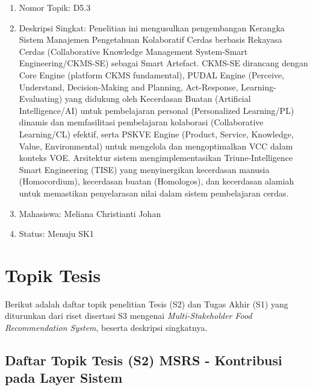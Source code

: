 \documentclass[
  letterpaper,
  DIV=11,
  numbers=noendperiod]{scrreprt}
\providecommand{\tightlist}{%
  \setlength{\itemsep}{0pt}\setlength{\parskip}{0pt}}
\begin{document}
\begin{enumerate}
  \begin{enumerate}
  \def\labelenumii{\arabic{enumii}.}
  \tightlist
  \item
    Nomor Topik: D5.3
  \item
    Deskripsi Singkat: Penelitian ini mengusulkan pengembangan Kerangka
    Sistem Manajemen Pengetahuan Kolaboratif Cerdas berbasis Rekayasa
    Cerdas (Collaborative Knowledge Management System-Smart
    Engineering/CKMS-SE) sebagai Smart Artefact. CKMS-SE dirancang
    dengan Core Engine (platform CKMS fundamental), PUDAL Engine
    (Perceive, Understand, Decision-Making and Planning, Act-Response,
    Learning-Evaluating) yang didukung oleh Kecerdasan Buatan
    (Artificial Intelligence/AI) untuk pembelajaran personal
    (Personalized Learning/PL) dinamis dan memfasilitasi pembelajaran
    kolaborasi (Collaborative Learning/CL) efektif, serta PSKVE Engine
    (Product, Service, Knowledge, Value, Environmental) untuk mengelola
    dan mengoptimalkan VCC dalam konteks VOE. Arsitektur sistem
    mengimplementasikan Triune-Intelligence Smart Engineering (TISE)
    yang menyinergikan kecerdasan manusia (Homocordium), kecerdasan
    buatan (Homologos), dan kecerdasan alamiah untuk memastikan
    penyelarasan nilai dalam sistem pembelajaran cerdas.
  \item
    Mahasiswa: Meliana Christianti Johan
  \item
    Status: Menuju SK1
  \end{enumerate}
\end{enumerate}


\chapter{Topik Tesis}\label{topik-tesis}

Berikut adalah daftar topik penelitian Tesis (S2) dan Tugas Akhir (S1)
yang diturunkan dari riset disertasi S3 mengenai \emph{Multi-Stakeholder
Food Recommendation System}, beserta deskripsi singkatnya.

\section{\texorpdfstring{\textbf{Daftar Topik Tesis (S2) MSRS -
Kontribusi pada Layer
Sistem}}{Daftar Topik Tesis (S2) MSRS - Kontribusi pada Layer Sistem}}\label{daftar-topik-tesis-s2-msrs---kontribusi-pada-layer-sistem}
\end{document}
